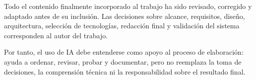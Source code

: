 \begin{refsection}
Todo el contenido finalmente incorporado al trabajo ha sido revisado, corregido y adaptado antes de su inclusión. Las decisiones sobre alcance, requisitos, diseño, arquitectura, selección de tecnologías, redacción final y validación del sistema corresponden al autor del trabajo.

Por tanto, el uso de IA debe entenderse como apoyo al proceso de elaboración: ayuda a ordenar, revisar, probar y documentar, pero no reemplaza la toma de decisiones, la comprensión técnica ni la responsabilidad sobre el resultado final.

{}
\printbibliography[heading=subbibliography]
\end{refsection}
